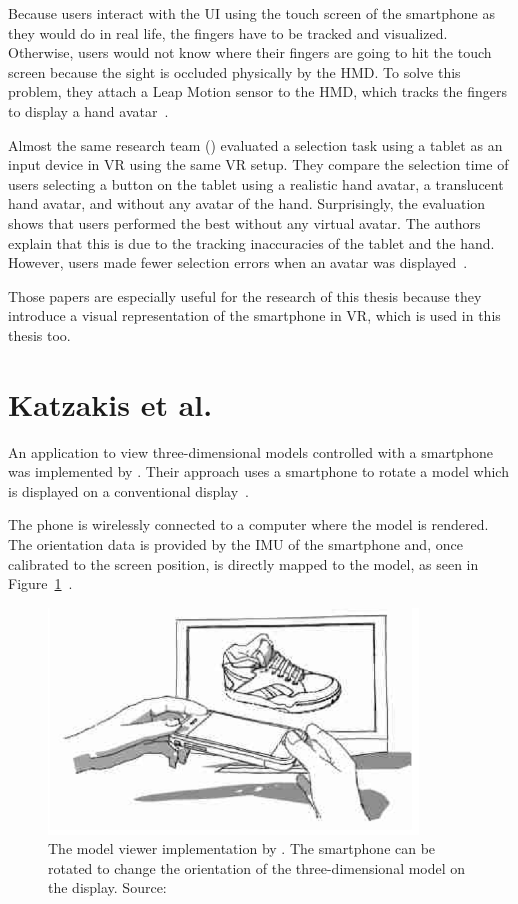 Because users interact with the \gls{UI} using the touch screen of the smartphone as they would do in real life, the fingers have to be tracked and visualized. Otherwise, users would not know where their fingers are going to hit the touch screen because the sight is occluded physically by the \gls{HMD}. To solve this problem, they attach a Leap Motion sensor to the \gls{HMD}, which tracks the fingers to display a hand avatar~\cite{Dias.2018}.

Almost the same research team (\citeauthor{Afonso.2017}) evaluated a selection task using a tablet as an input device in \gls{VR} using the same \gls{VR} setup. They compare the selection time of users selecting a button on the tablet using a realistic hand avatar, a translucent hand avatar, and without any avatar of the hand. Surprisingly, the evaluation shows that users performed the best without any virtual avatar. The authors explain that this is due to the tracking inaccuracies of the tablet and the hand. However, users made fewer selection errors when an avatar was displayed~\cite[247-248]{Afonso.2017}.

Those papers are especially useful for the research of this thesis because they introduce a visual representation of the smartphone in \gls{VR}, which is used in this thesis too. 


\section{Katzakis et al.\@}\label{section:katzakis-2010}
An application to view three-dimensional models controlled with a smartphone was implemented by \citeauthor{Katzakis.2010}. Their approach uses a smartphone to rotate a model which is displayed on a conventional display~\cite[139]{Katzakis.2010}. 

The phone is wirelessly connected to a computer where the model is rendered. The orientation data is provided by the \gls{IMU} of the smartphone and, once calibrated to the screen position, is directly mapped to the model, as seen in Figure~\ref{fig:katzakis-2010}~\cite[139]{Katzakis.2010}. 

\begin{figure}[H]%
  \centering%
  \includegraphics[height=6cm]{figures/related_work/katzakis_2010_3d_object.png}%
  \caption[Model viewer implementation by Katzakis et al.\@]{
  The model viewer implementation by \citeauthor{Katzakis.2010}. The smartphone can be rotated to change the orientation of the three-dimensional model on the display.
  \newline{}
  Source:~\cite[Figure 1]{Katzakis.2010}}\label{fig:katzakis-2010}
\end{figure}

